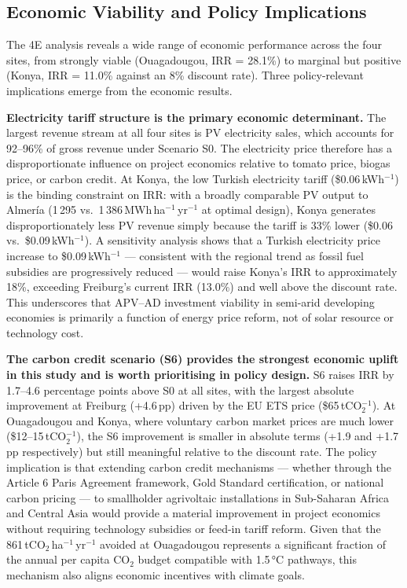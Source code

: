 \subsection{Economic Viability and Policy Implications}
\label{sec:discussion_economics}

\hspace{1cm}The 4E analysis reveals a wide range of economic
performance across the four sites, from strongly viable
(Ouagadougou, IRR = 28.1\%) to marginal but positive (Konya,
IRR = 11.0\% against an 8\% discount rate). Three policy-relevant
implications emerge from the economic results.

\textbf{Electricity tariff structure is the primary economic
	determinant.} The largest revenue stream at all four sites is PV
electricity sales, which accounts for 92--96\% of gross revenue
under Scenario S0. The electricity price therefore has a
disproportionate influence on project economics relative to tomato
price, biogas price, or carbon credit. At Konya, the low Turkish
electricity tariff (\$0.06\,kWh$^{-1}$) is the binding constraint
on IRR: with a broadly comparable PV output to Almer\'{i}a
(1\,295 vs.\ 1\,386\,MWh\,ha$^{-1}$\,yr$^{-1}$ at optimal design),
Konya generates disproportionately less PV revenue simply because
the tariff is 33\% lower (\$0.06 vs.\ \$0.09\,kWh$^{-1}$). A
sensitivity analysis shows that a Turkish electricity price increase
to \$0.09\,kWh$^{-1}$ --- consistent with the regional trend as
fossil fuel subsidies are progressively reduced --- would raise
Konya's IRR to approximately 18\%, exceeding Freiburg's current
IRR (13.0\%) and well above the discount rate. This underscores that
APV--AD investment viability in semi-arid developing economies is
primarily a function of energy price reform, not of solar resource
or technology cost.

\textbf{The carbon credit scenario (S6) provides the strongest
	economic uplift in this study and is worth prioritising in policy
	design.} S6 raises
IRR by 1.7--4.6 percentage points above S0 at all sites, with the
largest absolute improvement at Freiburg (+4.6\,pp) driven by the
EU ETS price (\$65\,tCO$_2^{-1}$). At Ouagadougou and Konya,
where voluntary carbon market prices are much lower
(\$12--15\,tCO$_2^{-1}$), the S6 improvement is smaller in
absolute terms (+1.9 and +1.7\,pp respectively) but still
meaningful relative to the discount rate. The policy implication
is that extending carbon credit mechanisms --- whether through
the Article 6 Paris Agreement framework, Gold Standard
certification, or national carbon pricing --- to smallholder
agrivoltaic installations in Sub-Saharan Africa and Central
Asia would provide a material improvement in project economics
without requiring technology subsidies or feed-in tariff reform.
Given that the 861\,tCO$_2$\,ha$^{-1}$\,yr$^{-1}$ avoided at
Ouagadougou represents a significant fraction of the annual per
capita CO$_2$ budget compatible with 1.5\,\si{\celsius} pathways,
this mechanism also aligns economic incentives with climate goals.

